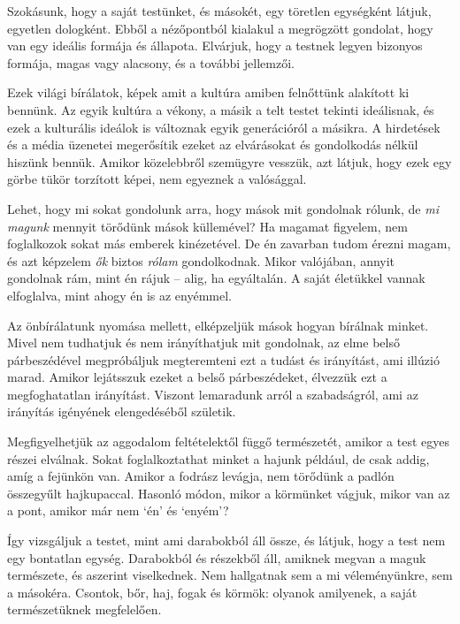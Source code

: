 Szokásunk, hogy a saját testünket, és másokét, egy töretlen egységként
látjuk, egyetlen dologként. Ebből a nézőpontból kialakul a megrögzött
gondolat, hogy van egy ideális formája és állapota. Elvárjuk, hogy a
testnek legyen bizonyos formája, magas vagy alacsony, és a további
jellemzői.

Ezek világi bírálatok, képek amit a kultúra amiben felnőttünk alakított
ki bennünk. Az egyik kultúra a vékony, a másik a telt testet tekinti
ideálisnak, és ezek a kulturális ideálok is változnak egyik generációról
a másikra. A hirdetések és a média üzenetei megerősítik ezeket az
elvárásokat és gondolkodás nélkül hiszünk bennük. Amikor közelebbről
szemügyre vesszük, azt látjuk, hogy ezek egy görbe tükör torzított
képei, nem egyeznek a valósággal.

Lehet, hogy mi sokat gondolunk arra, hogy mások mit gondolnak rólunk, de
\emph{mi magunk} mennyit törődünk mások küllemével? Ha magamat figyelem,
nem foglalkozok sokat más emberek kinézetével. De én zavarban tudom
érezni magam, és azt képzelem \emph{ők} biztos \emph{rólam}
gondolkodnak. Mikor valójában, annyit gondolnak rám, mint én rájuk --
alig, ha egyáltalán. A saját életükkel vannak elfoglalva, mint ahogy én
is az enyémmel.

\clearpage

Az önbírálatunk nyomása mellett, elképzeljük mások hogyan bírálnak
minket. Mivel nem tudhatjuk és nem irányíthatjuk mit gondolnak, az elme
belső párbeszédével megpróbáljuk megteremteni ezt a tudást és
irányítást, ami illúzió marad. Amikor lejátsszuk ezeket a belső
párbeszédeket, élvezzük ezt a megfoghatatlan irányítást. Viszont
lemaradunk arról a szabadságról, ami az irányítás igényének
elengedéséből születik.


Megfigyelhetjük az aggodalom feltételektől függő természetét, amikor a
test egyes részei elválnak. Sokat foglalkoztathat minket a hajunk
például, de csak addig, amíg a fejünkön van. Amikor a fodrász levágja,
nem törődünk a padlón összegyűlt hajkupaccal. Hasonló módon, mikor a
körmünket vágjuk, mikor van az a pont, amikor már nem `én' és `enyém'?

Így vizsgáljuk a testet, mint ami darabokból áll össze, és látjuk, hogy
a test nem egy bontatlan egység. Darabokból és részekből áll, amiknek
megvan a maguk természete, és aszerint viselkednek. Nem hallgatnak sem a
mi véleményünkre, sem a másokéra. Csontok, bőr, haj, fogak és körmök:
olyanok amilyenek, a saját természetüknek megfelelően.

